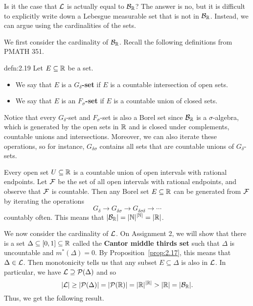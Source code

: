 Is it the case that ${\cal L}$ is actually equal to ${\cal B}_{\mathbb{R}}$? The 
answer is no, but it is difficult to explicitly write down a Lebesgue 
measurable set that is not in ${\cal B}_{\mathbb{R}}$. Instead, we can argue using the 
cardinalities of the sets. 

We first consider the cardinality of ${\cal B}_{\mathbb{R}}$. Recall the following 
definitions from PMATH 351. 

\begin{defn}{defn:2.19}
    Let $E \subseteq \mathbb{R}$ be a set. 
    \begin{itemize}
        \item We say that $E$ is a {\bf $G_\delta$-set} if $E$ is a 
        countable intersection of open sets. 
        \item We say that $E$ is an {\bf $F_\sigma$-set} if $E$ is a 
        countable union of closed sets. 
    \end{itemize}
\end{defn}

Notice that every $G_\delta$-set and $F_\sigma$-set is also a Borel set 
since ${\cal B}_{\mathbb{R}}$ is a $\sigma$-algebra, which is generated by the 
open sets in $\mathbb{R}$ and is closed under complements, countable unions and 
intersections. Moreover, we can also iterate these operations, so for 
instance, $G_{\delta\sigma}$ contains all sets that are countable unions of 
$G_\delta$-sets.  

Every open set $U \subseteq \mathbb{R}$ is a countable union of open intervals 
with rational endpoints. Let ${\cal F}$ be the set of all open intervals with 
rational endpoints, and observe that ${\cal F}$ is countable. Then 
any Borel set $E \subseteq \mathbb{R}$ can be generated from ${\cal F}$ by iterating 
the operations 
\[ G_\delta \to G_{\delta\sigma} \to G_{\delta\sigma\delta} \to \cdots \] 
countably often. This means that $|{\cal B}_{\mathbb{R}}| = |\mathbb{N}|^{|\mathbb{N}|} = |\mathbb{R}|$. 

We now consider the cardinality of ${\cal L}$. On Assignment 2, we will 
show that there is a set $\Delta \subseteq [0, 1] \subseteq \mathbb{R}$ called 
the {\bf Cantor middle thirds set} such that $\Delta$ is uncountable 
and $m^*(\Delta) = 0$. By Proposition~\ref{prop:2.17}, this means that 
$\Delta \in {\cal L}$. Then monotonicity tells us that any subset 
$E \subseteq \Delta$ is also in ${\cal L}$. In particular, we have 
${\cal L} \supseteq {\cal P}(\Delta)$ and so 
\[ |{\cal L}| \geq |{\cal P}(\Delta)| = |{\cal P}(\mathbb{R})| = |\mathbb{R}|^{|\mathbb{R}|} 
> |\mathbb{R}| = |{\cal B}_{\mathbb{R}}|. \] 
Thus, we get the following result. 

